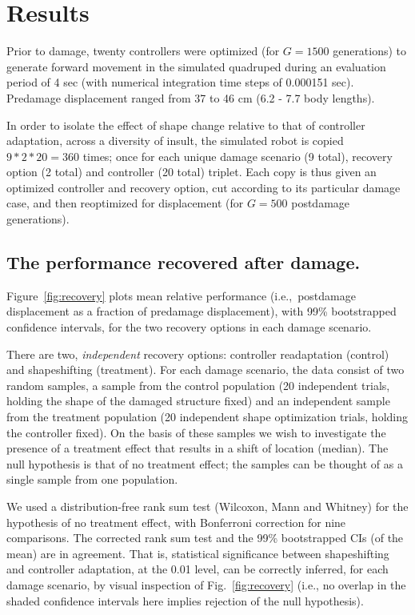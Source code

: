 
\section{Results}
\label{sec:results}


Prior to damage, twenty controllers were optimized (for \mbox{$G=1500$} generations) to generate forward movement in the simulated quadruped during an evaluation period of 4 sec (with numerical integration time steps of 0.000151 sec).
Predamage displacement ranged from 37 to 46 cm (6.2 - 7.7 body lengths).

In order to isolate the effect of shape change relative to that of controller adaptation, across a diversity of insult, the simulated robot is copied $9*2*20=360$ times; once for each unique damage scenario (9 total), recovery option (2 total) and controller (20 total) triplet. 
Each copy is thus given an optimized controller and recovery option, cut according to its particular damage case, and then reoptimized for displacement (for \mbox{$G=500$} postdamage generations).

\subsection{The performance recovered after damage.}


Figure~\ref{fig:recovery} plots 
mean relative performance (i.e.,~postdamage displacement as a fraction of predamage displacement),
with 99\% bootstrapped confidence intervals,
for the two recovery options in each damage scenario. 

 

There are two, \textit{independent} recovery options: controller readaptation (control) and shapeshifting (treatment).
For each damage scenario,
the data consist of two random samples, a sample from the control population (20 independent trials, holding the shape of the damaged structure fixed) and an independent sample from the treatment population (20 independent shape optimization trials, holding the controller fixed).
On the basis of these samples we wish to investigate the presence of a treatment effect that results in a shift of location (median).
The null hypothesis is that of no treatment effect; 
the samples can be thought of as a single sample from one population. 

We used a distribution-free rank sum test (Wilcoxon, Mann and Whitney) for the hypothesis of no treatment effect, with Bonferroni correction for nine comparisons.
The corrected rank sum test and the 99\% bootstrapped CIs (of the mean) are in agreement.
That is, statistical significance between shapeshifting and controller adaptation, at the 0.01 level, can be correctly inferred, for each damage scenario, by visual inspection of Fig.~\ref{fig:recovery} (i.e., no overlap in the shaded confidence intervals here implies rejection of the null hypothesis).

